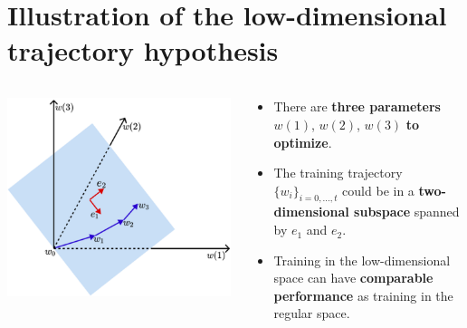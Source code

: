 \documentclass[t]{beamer}
\begin{document}
\section{Illustration of the low-dimensional trajectory hypothesis}
\begin{frame}
\begin{columns}[c]

\begin{column}{0.5\textwidth}
\begin{center}
\includegraphics[width=0.99\textwidth]{approach.png}
\end{center}
\end{column}

\begin{column}{0.5\textwidth}
\begin{itemize}
\item There are \textbf{three parameters} $w(1)$, $w(2)$, $w(3)$ \textbf{to optimize}. \vspace{1cm}
\item The training trajectory $\{w_i\}_{i=0,\dots,t}$ could be in a \textbf{two-dimensional subspace} spanned by $e_1$ and $e_2$. \vspace{1cm} 
\item Training in the low-dimensional space can have \textbf{comparable performance} as training in the regular space.
\end{itemize}
\end{column}
\end{columns}
\end{frame}
\end{document}
